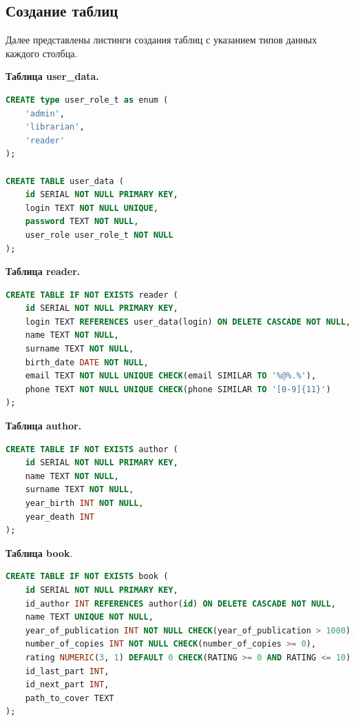 \subsection{Создание таблиц}
Далее представлены листинги создания таблиц с указанием типов данных каждого столбца.

\textbf{Таблица user\_data.}
\begin{lstlisting}[label={lst:user_data},caption=Создание таблицы user\_data., language=SQL]
CREATE type user_role_t as enum (
	'admin',
	'librarian',
	'reader'
);

CREATE TABLE user_data (
	id SERIAL NOT NULL PRIMARY KEY,
	login TEXT NOT NULL UNIQUE, 
	password TEXT NOT NULL, 
	user_role user_role_t NOT NULL
);
\end{lstlisting}

\textbf{Таблица reader.}
\begin{lstlisting}[label={lst:reader},caption=Создание таблицы reader., language=SQL]
CREATE TABLE IF NOT EXISTS reader (
	id SERIAL NOT NULL PRIMARY KEY,
	login TEXT REFERENCES user_data(login) ON DELETE CASCADE NOT NULL,
	name TEXT NOT NULL,
	surname TEXT NOT NULL,
	birth_date DATE NOT NULL,
	email TEXT NOT NULL UNIQUE CHECK(email SIMILAR TO '%@%.%'),
	phone TEXT NOT NULL UNIQUE CHECK(phone SIMILAR TO '[0-9]{11}')
);
\end{lstlisting}

\textbf{Таблица author.}
\begin{lstlisting}[label={lst:author},caption=Создание таблицы author., language=SQL]
CREATE TABLE IF NOT EXISTS author (
	id SERIAL NOT NULL PRIMARY KEY,
	name TEXT NOT NULL,
	surname TEXT NOT NULL,
	year_birth INT NOT NULL,
	year_death INT
);
\end{lstlisting}

\textbf{Таблица book}.
\begin{lstlisting}[label={lst:book},caption=Создание таблицы book., language=SQL]
CREATE TABLE IF NOT EXISTS book (
	id SERIAL NOT NULL PRIMARY KEY,
	id_author INT REFERENCES author(id) ON DELETE CASCADE NOT NULL,
	name TEXT UNIQUE NOT NULL,
	year_of_publication INT NOT NULL CHECK(year_of_publication > 1000),
	number_of_copies INT NOT NULL CHECK(number_of_copies >= 0),
	rating NUMERIC(3, 1) DEFAULT 0 CHECK(RATING >= 0 AND RATING <= 10) NOT NULL,
	id_last_part INT,
	id_next_part INT,
	path_to_cover TEXT
);
\end{lstlisting}

